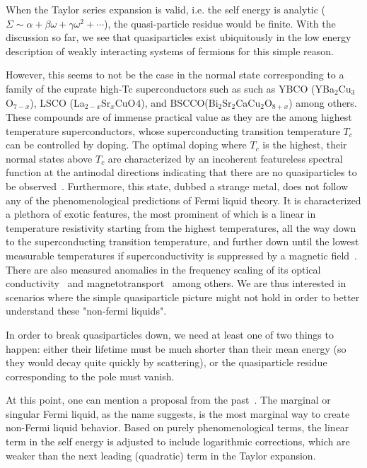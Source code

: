 \par
When the Taylor series expansion is valid, i.e. the self energy is analytic ($\Sigma \sim \alpha + \beta\omega + \gamma\omega^2 + \cdots$), the quasi-particle residue would be finite. With the discussion so far, we see that quasiparticles exist ubiquitously in the low energy description of weakly interacting systems of fermions for this simple reason. 
\par 
However, this seems to not be the case in the normal state corresponding to a family of the cuprate high-Tc superconductors such as such as YBCO (YBa${}_2$Cu${}_3$O${}_{7-x}$), LSCO (La${}_{2-x}$Sr${}_x$CuO$_{}4$), and BSCCO(Bi${}_2$Sr${}_2$CaCu${}_2$O${}_{8+x}$) among others. These compounds are of immense practical value as they are the among highest temperature superconductors, whose superconducting transition temperature $T_c$ can be controlled by doping. The optimal doping where $T_c$ is the highest, their normal states above $T_c$ are characterized by an incoherent featureless spectral function at the antinodal directions indicating that there are no quasiparticles to be observed~\cite{keimer2015quantum,damascelli2003angle}. Furthermore, this state, dubbed a strange metal, does not follow any of the phenomenological predictions of Fermi liquid theory. It is characterized a plethora of exotic features, the most prominent of which is a linear in temperature resistivity starting from the highest temperatures, all the way down to the superconducting transition temperature, and further down until the lowest measurable temperatures if superconductivity is suppressed by a magnetic field~\cite{Zaanen2019}. There are also measured anomalies in the frequency scaling of its optical conductivity~\cite{marel2003quantum,michon2023reconciling} and magnetotransport~\cite{hussey2008phenomenology,ayres2021incoherent} among others. We are thus interested in scenarios where the simple quasiparticle picture might not hold in order to better understand these "non-fermi liquids". 
\par
In order to break quasiparticles down, we need at least one of two things to happen: either their lifetime must be much shorter than their mean energy (so they would decay quite quickly by scattering), or the quasiparticle residue corresponding to the pole must vanish. 
\par
At this point, one can mention a proposal from the past~\cite{varma1989phenomenology,ruckenstein1991theory,varma1993towards,varma2002singular}. The marginal or singular Fermi liquid, as the name suggests, is the most marginal way to create non-Fermi liquid behavior. Based on purely phenomenological terms, the linear term in the self energy is adjusted to include logarithmic corrections, which are weaker than the next leading (quadratic) term in the Taylor expansion. 
\par

